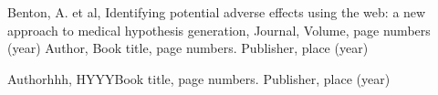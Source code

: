 \begin{thebibliography}{}
%
%
Benton, A. et al, Identifying potential adverse effects using the web: a new approach to medical hypothesis generation, Journal, Volume, page numbers (year)
Author, Book title, page numbers. Publisher, place (year)

Authorhhh, HYYYBook title, page numbers. Publisher, place (year)
\end{thebibliography}